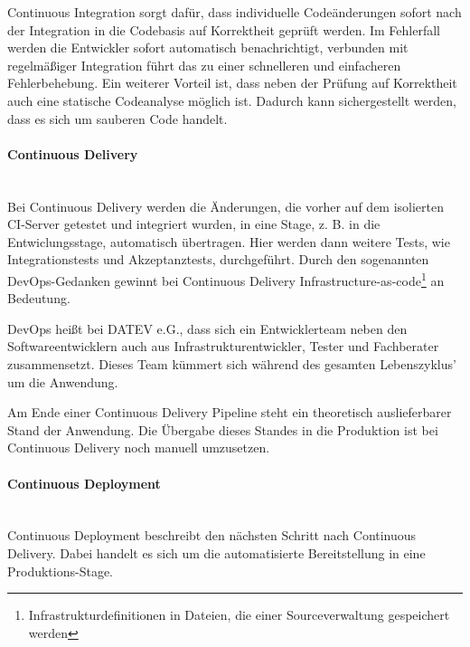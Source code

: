 Continuous Integration sorgt dafür, dass individuelle Codeänderungen sofort nach der Integration in die Codebasis auf Korrektheit geprüft werden.
Im Fehlerfall werden die Entwickler sofort automatisch benachrichtigt, verbunden mit regelmäßiger Integration führt das zu einer schnelleren und einfacheren Fehlerbehebung.
Ein weiterer Vorteil ist, dass neben der Prüfung auf Korrektheit auch eine statische Codeanalyse möglich ist.
Dadurch kann sichergestellt werden, dass es sich um sauberen Code handelt.
\cite{Laster.2017}

\paragraph{\glqq Continuous Delivery\grqq}~\\
Bei Continuous Delivery werden die Änderungen, die vorher auf dem isolierten CI-Server getestet und integriert wurden, in eine Stage, z. B. in die Entwiclungsstage, automatisch übertragen.
Hier werden dann weitere Tests, wie Integrationstests und Akzeptanztests, durchgeführt.
Durch den sogenannten \glqq DevOps\grqq-Gedanken gewinnt bei Continuous Delivery \glqq Infrastructure-as-code\grqq{}\footnote{Infrastrukturdefinitionen in Dateien, die einer Sourceverwaltung gespeichert werden} an Bedeutung.

DevOps heißt bei DATEV e.G., dass sich ein Entwicklerteam neben den Softwareentwicklern auch aus Infrastrukturentwickler, Tester und Fachberater zusammensetzt.
Dieses Team kümmert sich während des gesamten Lebenszyklus' um die Anwendung.

Am Ende einer Continuous Delivery Pipeline steht ein theoretisch auslieferbarer Stand der Anwendung.
Die Übergabe dieses Standes in die Produktion ist bei Continuous Delivery noch manuell umzusetzen.
\cite{Laster.2017}

\paragraph{\glqq Continuous Deployment\grqq}~\\
Continuous Deployment beschreibt den nächsten Schritt nach Continuous Delivery.
Dabei handelt es sich um die automatisierte Bereitstellung in eine Produktions-Stage.
\cite{Laster.2017}

